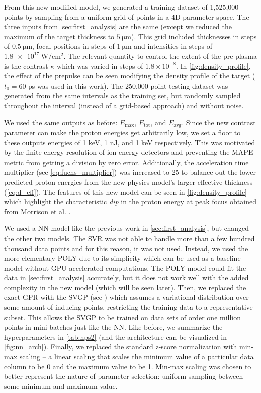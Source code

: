 From this new modified model, we generated a training dataset of 1,525,000 points by sampling from a uniform grid of points in a 4D parameter space. The three inputs from \autoref{sec:first_analysis} are the same (except we reduced the maximum of the target thickness to $\SI{5}{\micro \meter}$). This grid included thicknesses in steps of $\SI{0.5}{\micro \meter}$, focal positions in steps of $\SI{1}{\micro \meter}$ and intensities in steps of $\SI{1.8e17}{\watt \per \centi \meter \squared}$. The relevant quantity to control the extent of the pre-plasma is the contrast $\kappa$ which was varied in steps of $1.8 \times 10^{-8}$. In \autoref{fig:density_profile}, the effect of the prepulse can be seen modifying the density profile of the target ($t_0 = 60$ ps was used in this work). The 250,000 point testing dataset was generated from the same intervals as the training set, but randomly sampled throughout the interval (instead of a grid-based approach) and without noise.

We used the same outputs as before: $E_\text{max}$, $E_\text{tot}$, and $E_\text{avg}$. Since the new contrast parameter can make the proton energies get arbitrarily low, we set a floor to these outputs energies of 1 keV, 1 nJ, and 1 keV respectively. This was motivated by the finite energy resolution of ion energy detectors and preventing the \gls{MAPE} metric from getting a division by zero error. Additionally, the acceleration time multiplier (see \autoref{eq:fuchs_multiplier}) was increased to 25 to balance out the lower predicted proton energies from the new physics model's larger effective thickness (\autoref{eq:d_eff}). The features of this new model can be seen in \autoref{fig:density_profile} which highlight the characteristic \emph{dip} in the proton energy at peak focus obtained from Morrison et al. \cite{Morrison_2018_NJoP}.

We used a \gls{NN} model like the previous work in \autoref{sec:first_analysis}, but changed the other two models. The \gls{SVR} was not able to handle more than a few hundred thousand data points and for this reason, it was not used. Instead, we used the more elementary \gls{POLY} due to its simplicity which can be used as a baseline model without \gls{GPU} accelerated computations. The \gls{POLY} model could fit the data in \autoref{sec:first_analysis} accurately, but it does not work well with the added complexity in the new model (which will be seen later). Then, we replaced the exact \gls{GPR} with the \gls{SVGP} (see \cite{Hensman_2014_SVGP}) which assumes a variational distribution over some amount of inducing points, restricting the training data to a representative subset. This allows the \gls{SVGP} to be trained on data sets of order one million points in mini-batches just like the \gls{NN}. Like before, we summarize the hyperparameters in \autoref{tab:hps2} (and the architecture can be visualized in \autoref{fig:nn_arch}).  Finally, we replaced the standard z-score normalization with min-max scaling -- a linear scaling that scales the minimum value of a particular data column to be 0 and the maximum value to be 1. Min-max scaling was chosen to better represent the nature of parameter selection: uniform sampling between some minimum and maximum value.

